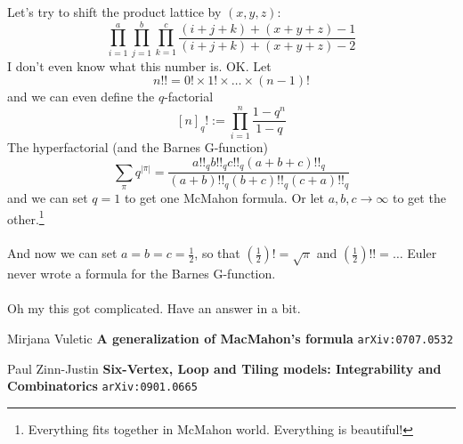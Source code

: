 \documentclass[12pt]{article}
\begin{document}
\noindent Let's try to shift the product lattice by $(x,y,z)$:
$$  
\prod_{i=1}^a 
\prod_{j=1}^b
\prod_{k=1}^c \frac{(i+j+k)+(x+y+z)-1}{(i+j+k)+(x+y+z)-2} $$
I don't even know what this number is.  OK.  Let
$$ n!! = 0! \times 1! \times \dots \times (n-1)! $$
and we can even define the $q$-factorial 
$$[n]_q! := \prod_{i=1}^n \frac{1 -q^n}{1-q} $$
The hyperfactorial (and the Barnes G-function)
$$ \sum_\pi q^{|\pi|} = \frac{a!!_q b!!_q c!!_q (a+b+c)!!_q}{(a+b)!!_q (b+c)!!_q (c+a)!!_q} $$
and we can set $q=1$ to get one McMahon formula.  Or let $a,b,c \to \infty$ to get the other.\footnote{Everything fits together in McMahon world.  Everything is beautiful!} \\ \\
And now we can set $a = b = c = \frac{1}{2}$, so that $(\frac{1}{2})! = \sqrt{\pi}$ and $(\frac{1}{2})!! = \dots $ Euler never wrote a formula for the Barnes G-function. \\ \\
Oh my this got complicated.  Have an answer in a bit.
\newpage

\selectfont \fontsize{12}{10}\selectfont


\begin{thebibliography}{}

\item Mirjana Vuletic \textbf{A generalization of MacMahon's formula} \texttt{arXiv:0707.0532}

\item Paul Zinn-Justin \textbf{Six-Vertex, Loop and Tiling models: Integrability and Combinatorics} \texttt{arXiv:0901.0665}


\end{thebibliography}
\end{document}
